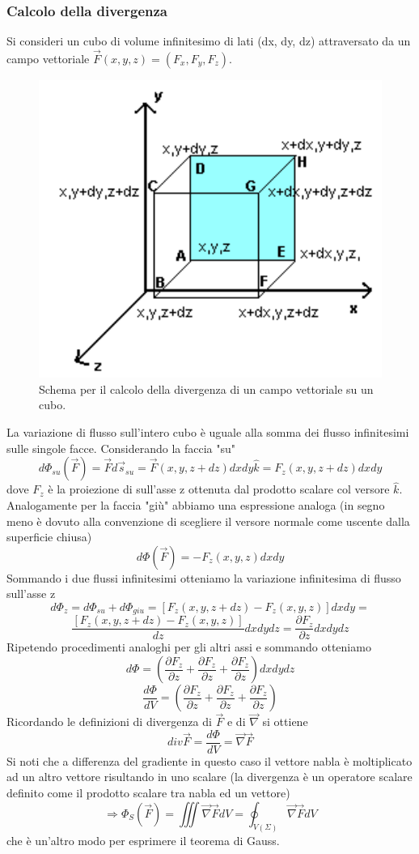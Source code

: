 \documentclass[10pt,a4paper]{article}
\begin{document}
\subsubsection{Calcolo della divergenza}
Si consideri un cubo di volume infinitesimo di lati (dx, dy, dz) attraversato da un campo vettoriale $\vec{F}(x,y,z) = (F_x, F_y, F_z)$.  
\begin{figure}[h!]
	\centering
	\includegraphics[width=0.6\linewidth]{images/div_quadrato}
	\caption{Schema per il calcolo della divergenza di un campo vettoriale su un cubo.}
	\label{fig:divquadrato}
\end{figure}
\FloatBarrier
La variazione di flusso sull'intero cubo è uguale alla somma dei flusso infinitesimi sulle singole facce. Considerando la faccia "su"
\[d\Phi_{su}(\vec{F}) = \vec{F}d\vec{s}_{su} = \vec{F}(x, y, z + dz)dxdy\hat{k}=F_z(x, y, z + dz)dxdy\]
dove \(F_z\) è la proiezione di sull'asse z ottenuta dal prodotto scalare col versore \(\hat{k}\). 
Analogamente per la faccia "giù" abbiamo una espressione analoga (in segno meno è dovuto alla convenzione di scegliere il versore normale come uscente dalla superficie chiusa)
\[d\Phi(\vec{F}) = -F_z(x, y, z)dxdy\]
Sommando i due flussi infinitesimi otteniamo la variazione infinitesima di flusso sull'asse z
\[d\Phi_z= d\Phi_{su}+d\Phi_{giu}=\left[F_z(x,y,z+dz)-F_z(x,y,z)\right]dxdy=\]
\[\frac{\left[F_z(x,y,z+dz)-F_z(x,y,z)\right]}{dz}dxdydz=\frac{\partial F_z}{\partial z}dxdydz\]
Ripetendo procedimenti analoghi per gli altri assi e sommando otteniamo
\[d\Phi = \left(\frac{\partial F_z}{\partial z}+ \frac{\partial F_z}{\partial z}+ \frac{\partial F_z}{\partial z}\right)dxdydz \]
\[\frac{d\Phi}{dV} = \left(\frac{\partial F_z}{\partial z}+ \frac{\partial F_z}{\partial z}+ \frac{\partial F_z}{\partial z}\right)\]
Ricordando le definizioni di divergenza di $\vec{F}$ e di \(\vec{\nabla}\) si ottiene
\[div\vec{F} = \frac{d\Phi}{dV} = \vec{\nabla}\vec{F}\]
Si noti che a differenza del gradiente in questo caso il vettore nabla è moltiplicato ad un altro vettore risultando in uno scalare (la divergenza è un operatore scalare definito come il prodotto scalare tra nabla ed un vettore)
\[\Rightarrow \Phi_S(\vec{F}) = \iiint \vec{\nabla}\vec{F}dV = \oint_{V(\Sigma)} \vec{\nabla}\vec{F}dV\]
che è un'altro modo per esprimere il teorema di Gauss.
\end{document}
